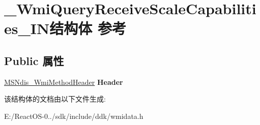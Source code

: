 \hypertarget{struct___wmi_query_receive_scale_capabilities___i_n}{}\section{\+\_\+\+Wmi\+Query\+Receive\+Scale\+Capabilities\+\_\+\+I\+N结构体 参考}
\label{struct___wmi_query_receive_scale_capabilities___i_n}
\subsection*{Public 属性}
\begin{DoxyCompactItemize}
\item 
\mbox{\label{struct___wmi_query_receive_scale_capabilities___i_n_a5fc44b613313aff2a74aed35f6c6eb0a}} 
\hyperlink{struct___m_s_ndis___wmi_method_header}{M\+S\+Ndis\+\_\+\+Wmi\+Method\+Header} {\bfseries Header}
\end{DoxyCompactItemize}


该结构体的文档由以下文件生成\+:\begin{DoxyCompactItemize}
\item 
E\+:/\+React\+O\+S-\/0../sdk/include/ddk/wmidata.\+h\end{DoxyCompactItemize}
